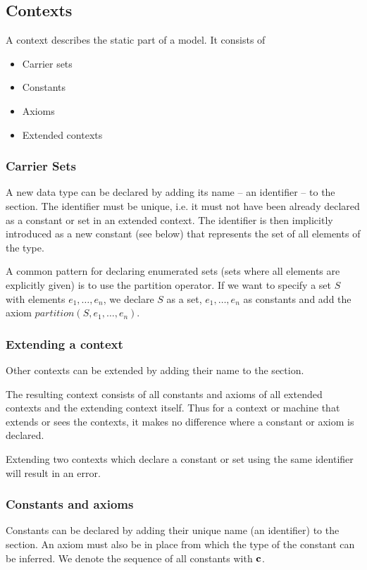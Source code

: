 \subsection{Contexts}
\label{context}

A context describes the static part of a model. It consists of
\begin{itemize}
\item Carrier sets
\item Constants
\item Axioms
\item Extended contexts
\end{itemize}

\subsubsection{Carrier Sets}
\label{carrier_sets}
A new data type can be declared by adding its name -- an identifier -- to the  section.
The identifier must be unique, i.e. it must not have been already declared as a constant or set in an extended context.
The identifier is then implicitly introduced as a new constant (see below) that represents the set of all elements of the type. 

A common pattern for declaring enumerated sets (sets where all elements are explicitly given)
is to use the partition operator. If we want to specify a set $S$ with elements $e_1,\ldots,e_n$,
we declare $S$ as a set, $e_1,\ldots,e_n$ as constants and add the axiom $partition(S,e_1,\ldots,e_n)$.

\subsubsection{Extending a context}
Other contexts can be extended by adding their name to the  section.

The resulting context consists of all constants and axioms of all extended contexts and the extending context itself.
Thus for a context or machine that extends or sees the contexts, it makes no difference where a constant or axiom is declared.

Extending two contexts which declare a constant or set using the same identifier will result in an error.

\subsubsection{Constants and axioms}
\label{constants_and_axioms}
Constants can be declared by adding their unique name (an identifier) to the  section.
An axiom must also be in place from which the type of the constant can be inferred.
We denote the sequence of all constants with $\mathbf{c}$.

